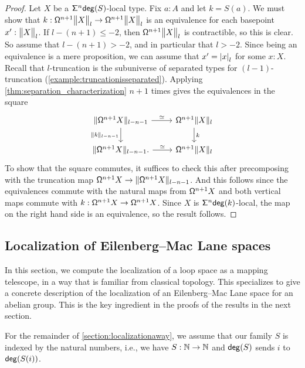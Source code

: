 \begin{proof}
    Let $X$ be a $\suspsym^n \degg(S)$-local type.
    Fix $a : A$ and let $k = S(a)$.
    We must show that $k : \loopspacesym^{n+1} \ttrunc{l}{X} \to \loopspacesym^{n+1} \ttrunc{l}{X}$
    is an equivalence for each basepoint $x' : \ttrunc{l}{X}$.
    If $l - (n+1) \leq -2$, then $\loopspacesym^{n+1} \ttrunc{l}{X}$ is
    contractible, so this is clear.
    So assume that $l - (n+1) > -2$, and in particular that $l > -2$.
    Since being an equivalence is a mere proposition,
    we can assume that $x' = \tproj{l}{x}$ for some $x : X$.
    Recall that $l$-truncation
    is the subuniverse of separated types for $(l-1)$-truncation (\cref{example:truncationisseparated}).
    Applying \cref{thm:separation_characterization} $n+1$ times gives the equivalences
    in the square
\begin{equation*}
\begin{tikzcd}
\trunc{l-n-1}{\loopspacesym^{n+1} X} \arrow[d,swap,"\trunc{l-n-1}{k}"] \arrow[r,"\eqvsym"] & \loopspacesym^{n+1} \trunc{l}X \arrow[d,"k"] \\
\trunc{l-n-1}{\loopspacesym^{n+1} X}. \arrow[r,"\eqvsym"] & \loopspacesym^{n+1} \trunc{l} X
\end{tikzcd}
\end{equation*}
    To show that the square commutes, it suffices to check this after precomposing
    with the truncation map $\loopspacesym^{n+1} X \to \trunc{l-n-1}{\loopspacesym^{n+1} X}$.
    And this follows since the equivalences commute with the natural maps from
    $\loopspacesym^{n+1} X$ and
    both vertical maps commute with $k : \loopspacesym^{n+1} X \to \loopspacesym^{n+1} X$.
    Since $X$ is $\suspsym^n \degg(k)$-local, the map on the right hand side is an equivalence,
    so the result follows.
\end{proof}

\subsection{Localization of Eilenberg--Mac Lane spaces}\label{ss:localizingKgn}

In this section, we compute the localization of a loop space as a mapping telescope,
in a way that is familiar from classical topology.
This specializes to give a concrete description of the
localization of an Eilenberg--Mac Lane space for an abelian group.
This is the key ingredient in the proofs of the results in the next section.

For the remainder of \cref{section:localizationaway}, we assume that our family
$S$ is indexed by the natural numbers, i.e., we have $S : \N \to \N$ and
$\degg(S)$ sends $i$ to $\degg(S(i))$.

